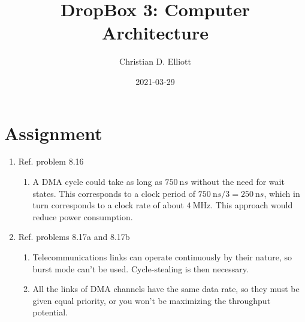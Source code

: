 \documentclass[11pt]{article}
\author{Christian D. Elliott}
\date{2021-03-29}
\title{DropBox 3: Computer Architecture}
\begin{document}
\maketitle
\tableofcontents


\section{Assignment}
\label{sec:org81ad602}
\begin{enumerate}
\item Ref. problem 8.16
\begin{enumerate}
\item A DMA cycle could take as long as \(\SI{750}{\nano}s\) without the need for
wait states. This corresponds to a clock period of \(\SI{750}{\nano}s / 3
      = \SI{250}{\nano}s\), which in turn corresponds to a clock rate of about
\(\SI{4}{\mega\hertz}\). This approach would reduce power consumption.
\end{enumerate}

\item Ref. problems 8.17a and 8.17b

\begin{enumerate}
\item Telecommunications links can operate continuously by their nature, so
burst mode can't be used. Cycle-stealing is then necessary.

\item All the links of DMA channels have the same data rate, so they must
be given equal priority, or you won't be maximizing the throughput
potential.
\end{enumerate}
\end{enumerate}
\end{document}
